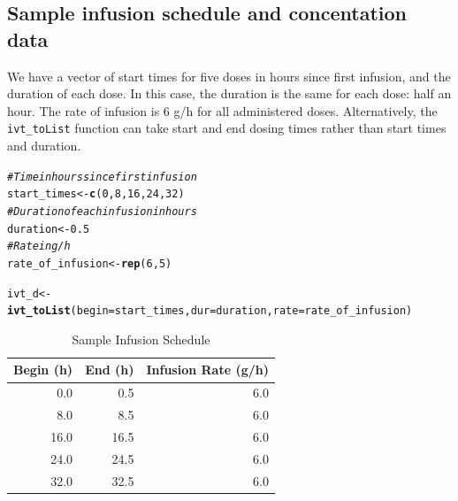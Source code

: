 \documentclass{article}\usepackage[]{graphicx}\usepackage[]{color}
\makeatletter
\newcommand{\hlnum}[1]{\textcolor[rgb]{0.686,0.059,0.569}{#1}}%
\newcommand{\hlcom}[1]{\textcolor[rgb]{0.678,0.584,0.686}{\textit{#1}}}%
\newcommand{\hlstd}[1]{\textcolor[rgb]{0.345,0.345,0.345}{#1}}%
\newcommand{\hlkwb}[1]{\textcolor[rgb]{0.69,0.353,0.396}{#1}}%
\newcommand{\hlkwc}[1]{\textcolor[rgb]{0.333,0.667,0.333}{#1}}%
\newcommand{\hlkwd}[1]{\textcolor[rgb]{0.737,0.353,0.396}{\textbf{#1}}}%
\newenvironment{kframe}{%
 \def\at@end@of@kframe{}%
 \ifinner\ifhmode%
  \def\at@end@of@kframe{\end{minipage}}%
  \begin{minipage}{\columnwidth}%
 \fi\fi%
 \def\FrameCommand##1{\hskip\@totalleftmargin \hskip-\fboxsep
 \colorbox{shadecolor}{##1}\hskip-\fboxsep
     \hskip-\linewidth \hskip-\@totalleftmargin \hskip\columnwidth}%
 \MakeFramed {\advance\hsize-\width
   \@totalleftmargin\z@ \linewidth\hsize
   \@setminipage}}%
 {\par\unskip\endMakeFramed%
 \at@end@of@kframe}
\newenvironment{knitrout}{}{} %
\makeatother
\begin{document}
\subsection{Sample infusion schedule and concentation data}

We have a vector of start times for five doses in hours since first infusion, and the duration of each dose. In this case, the duration is the same for each dose: half an hour. The rate of infusion is 6 g/h for all administered doses. Alternatively, the \texttt{ivt\_toList} function can take start and end dosing times rather than start times and duration.
\begin{knitrout}
\color{fgcolor}\begin{kframe}
\begin{alltt}
\hlcom{# Time in hours since first infusion}
\hlstd{start_times} \hlkwb{<-} \hlkwd{c}\hlstd{(}\hlnum{0}\hlstd{,} \hlnum{8}\hlstd{,} \hlnum{16}\hlstd{,} \hlnum{24}\hlstd{,} \hlnum{32}\hlstd{)}
\hlcom{# Duration of each infusion in hours}
\hlstd{duration} \hlkwb{<-} \hlnum{0.5}
\hlcom{# Rate in g/h}
\hlstd{rate_of_infusion} \hlkwb{<-} \hlkwd{rep}\hlstd{(}\hlnum{6}\hlstd{,} \hlnum{5}\hlstd{)}

\hlstd{ivt_d} \hlkwb{<-} \hlkwd{ivt_toList}\hlstd{(}\hlkwc{begin} \hlstd{= start_times,} \hlkwc{dur} \hlstd{= duration,} \hlkwc{rate} \hlstd{= rate_of_infusion)}
\end{alltt}
\end{kframe}
\end{knitrout}

\begin{table}[ht]
\centering
\caption{Sample Infusion Schedule} 
\begin{tabular}{rrr}
  \hline
Begin (h) & End (h) & Infusion Rate (g/h) \\ 
  \hline
0.0 & 0.5 & 6.0 \\ 
  8.0 & 8.5 & 6.0 \\ 
  16.0 & 16.5 & 6.0 \\ 
  24.0 & 24.5 & 6.0 \\ 
  32.0 & 32.5 & 6.0 \\ 
   \hline
\end{tabular}
\end{table}
\end{document}
